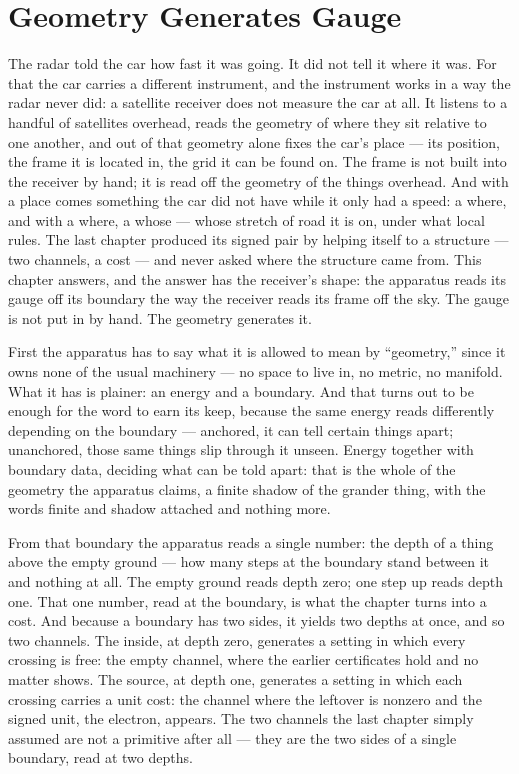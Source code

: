 \chapter{Geometry Generates Gauge}

The radar told the car how fast it was going. It did not tell it where it was. For that the car carries a different instrument, and the instrument works in a way the radar never did: a satellite receiver does not measure the car at all. It listens to a handful of satellites overhead, reads the geometry of where they sit relative to one another, and out of that geometry alone fixes the car's place --- its position, the frame it is located in, the grid it can be found on. The frame is not built into the receiver by hand; it is read off the geometry of the things overhead. And with a place comes something the car did not have while it only had a speed: a where, and with a where, a whose --- whose stretch of road it is on, under what local rules. The last chapter produced its signed pair by helping itself to a structure --- two channels, a cost --- and never asked where the structure came from. This chapter answers, and the answer has the receiver's shape: the apparatus reads its gauge off its boundary the way the receiver reads its frame off the sky. The gauge is not put in by hand. The geometry generates it.

First the apparatus has to say what it is allowed to mean by ``geometry,'' since it owns none of the usual machinery --- no space to live in, no metric, no manifold. What it has is plainer: an energy and a boundary. And that turns out to be enough for the word to earn its keep, because the same energy reads differently depending on the boundary --- anchored, it can tell certain things apart; unanchored, those same things slip through it unseen. Energy together with boundary data, deciding what can be told apart: that is the whole of the geometry the apparatus claims, a finite shadow of the grander thing, with the words finite and shadow attached and nothing more.

From that boundary the apparatus reads a single number: the depth of a thing above the empty ground --- how many steps at the boundary stand between it and nothing at all. The empty ground reads depth zero; one step up reads depth one. That one number, read at the boundary, is what the chapter turns into a cost. And because a boundary has two sides, it yields two depths at once, and so two channels. The inside, at depth zero, generates a setting in which every crossing is free: the empty channel, where the earlier certificates hold and no matter shows. The source, at depth one, generates a setting in which each crossing carries a unit cost: the channel where the leftover is nonzero and the signed unit, the electron, appears. The two channels the last chapter simply assumed are not a primitive after all --- they are the two sides of a single boundary, read at two depths.

